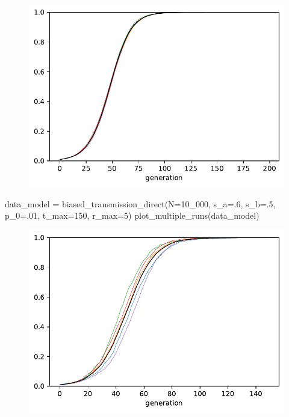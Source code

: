 \documentclass[
  a4paperpaper,
  ,captions=tableheading
]{scrbook}
\newenvironment{Shaded}{\begin{snugshade}}{\end{snugshade}}
\newcommand{\DecValTok}[1]{\textcolor[rgb]{0.68,0.00,0.00}{#1}}
\newcommand{\FloatTok}[1]{\textcolor[rgb]{0.68,0.00,0.00}{#1}}
\newcommand{\NormalTok}[1]{\textcolor[rgb]{0.00,0.23,0.31}{#1}}
\newcommand{\OperatorTok}[1]{\textcolor[rgb]{0.37,0.37,0.37}{#1}}
\begin{document}
\begin{figure}[H]

{\centering \includegraphics{chapter05_files/figure-pdf/cell-5-output-1.pdf}

}

\end{figure}

\begin{Shaded}
\begin{Highlighting}[]
\NormalTok{data\_model }\OperatorTok{=}\NormalTok{ biased\_transmission\_direct(N}\OperatorTok{=}\DecValTok{10\_000}\NormalTok{, s\_a}\OperatorTok{=}\FloatTok{.6}\NormalTok{, s\_b}\OperatorTok{=}\FloatTok{.5}\NormalTok{, }
\NormalTok{                                         p\_0}\OperatorTok{=}\FloatTok{.01}\NormalTok{, t\_max}\OperatorTok{=}\DecValTok{150}\NormalTok{, r\_max}\OperatorTok{=}\DecValTok{5}\NormalTok{)}
\NormalTok{plot\_multiple\_runs(data\_model)}
\end{Highlighting}
\end{Shaded}

\begin{figure}[H]

{\centering \includegraphics{chapter05_files/figure-pdf/cell-6-output-1.pdf}

}

\end{figure}
\end{document}
